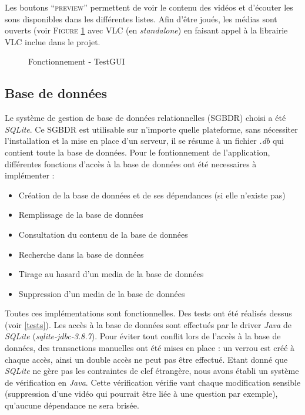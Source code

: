 Les boutons ``\textsc{preview}'' permettent de voir le contenu des vidéos et d'écouter les sons disponibles dans les différentes listes. Afin d'être joués, les médias sont ouverts (voir \textsc{Figure} \ref{VLC} avec VLC (en \textit{standalone}) en faisant appel à la librairie VLC inclue dans le projet.

\begin{figure}[!ht]
\begin{center}
  \caption{Fonctionnement - TestGUI}
  \label{VLC} 
\end{center}
\end{figure}

\subsection{Base de données}

Le système de gestion de base de données relationnelles (SGBDR) choisi a été \textit{SQLite}. Ce SGBDR est utilisable sur n'importe quelle plateforme, sans nécessiter l'installation et la mise en place d'un serveur, il se résume à un fichier \textit{.db} qui contient toute la base de données.
Pour le fontionnement de l'application, différentes fonctions d'accès à la base de données ont été necessaires à implémenter :
\begin{itemize}
 \item Création de la base de données et de ses dépendances (si elle n'existe pas)
 \item Remplissage de la base de données
 \item Consultation du contenu de la base de données
 \item Recherche dans la base de données
 \item Tirage au hasard d'un media de la base de données
 \item Suppression d'un media de la base de données
\end{itemize}
Toutes ces implémentations sont fonctionnelles. Des tests ont été réalisés dessus (voir \ref{tests}).
Les accès à la base de données sont effectués par le driver \textit{Java} de \textit{SQLite} (\textit{sqlite-jdbc-3.8.7}).
Pour éviter tout conflit lors de l'accès à la base de données, des transactions manuelles ont été mises en place : un verrou est créé à chaque accès, ainsi un double accès ne peut pas être effectué.
Etant donné que \textit{SQLite} ne gère pas les contraintes de clef étrangère, nous avons établi un système de vérification en \textit{Java}. Cette vérification vérifie vant chaque modification sensible (suppression d'une vidéo qui pourrait être liée à une question par exemple), qu'aucune dépendance ne sera brisée.


